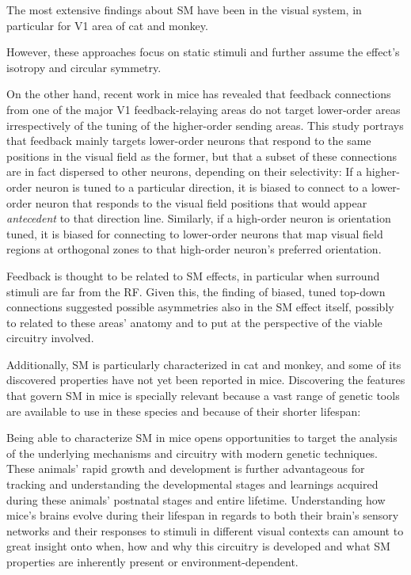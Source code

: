 The most extensive findings about SM have been in the visual system, in particular for V1 area of cat and monkey.

However, these approaches focus on static stimuli and further assume the effect's isotropy and circular symmetry. 

On the other hand, recent work in mice has revealed that feedback connections from one of the major V1 feedback-relaying areas do not target lower-order areas irrespectively of the tuning of the higher-order sending areas. This study portrays that feedback mainly targets lower-order neurons that respond to the same positions in the visual field as the former, but that a subset of these connections are in fact dispersed to other neurons, depending on their selectivity: If a higher-order neuron is tuned to a particular direction, it is biased to connect to a lower-order neuron that responds to the visual field positions that would appear \textit{antecedent} to that direction line. Similarly, if a high-order neuron is orientation tuned, it is biased for connecting to lower-order neurons that map visual field regions at orthogonal zones to that high-order neuron's preferred orientation. 

Feedback is thought to be related to SM effects, in particular when surround stimuli are far from the RF. Given this, the finding of biased, tuned top-down connections suggested possible asymmetries also in the SM effect itself, possibly to related to these areas' anatomy and to put at the perspective of the viable circuitry involved.

Additionally, SM is particularly characterized in cat and monkey, and some of its discovered properties have not yet been reported in mice. Discovering the features that govern SM in mice is specially relevant because a vast range of genetic tools are available to use in these species and because of their shorter lifespan:

Being able to characterize SM in mice opens opportunities to target the analysis of the underlying mechanisms and circuitry with modern genetic techniques. These animals' rapid growth and development is further advantageous for tracking and understanding the developmental stages and learnings acquired during these animals' postnatal stages and entire lifetime. Understanding how mice's brains evolve during their lifespan in regards to both their brain's sensory networks and their responses to stimuli in different visual contexts can amount to great insight onto when, how and why this circuitry is developed and what SM properties are inherently present or environment-dependent.

